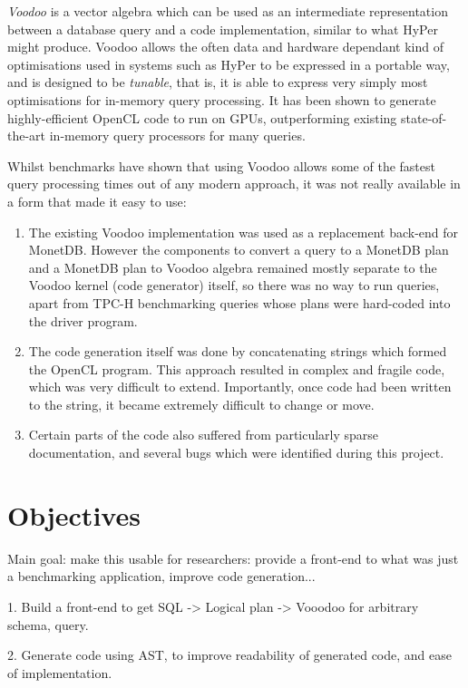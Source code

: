 \emph{Voodoo} \cite{Pirk:2016:VVA:3007328.3007336} is a vector algebra which can be used as an intermediate representation between a database query and a code implementation, similar to what HyPer might produce. Voodoo allows the often data and hardware dependant kind of optimisations used in systems such as HyPer to be expressed in a portable way, and is designed to be \emph{tunable}, that is, it is able to express very simply most optimisations for in-memory query processing. It has been shown to generate highly-efficient OpenCL code to run on GPUs, outperforming existing state-of-the-art in-memory query processors for many queries.

Whilst benchmarks have shown that using Voodoo allows some of the fastest query processing times out of any modern approach, it was not really available in a form that made it easy to use:

\begin{enumerate}
    \item The existing Voodoo implementation was used as a replacement back-end for MonetDB. However the components to convert a query to a MonetDB plan and a MonetDB plan to Voodoo algebra remained mostly separate to the Voodoo kernel (code generator) itself, so there was no way to run queries, apart from TPC-H benchmarking queries whose plans were hard-coded into the driver program.
    \item The code generation itself was done by concatenating strings which formed the OpenCL program. This approach resulted in complex and fragile code, which was very difficult to extend. Importantly, once code had been written to the string, it became extremely difficult to change or move.
    \item Certain parts of the code also suffered from particularly sparse documentation, and several bugs which were identified during this project.
\end{enumerate}

\section{Objectives}

Main goal: make this usable for researchers: provide a front-end to what was just a benchmarking application, improve code generation...

1. Build a front-end to get SQL -> Logical plan -> Vooodoo for arbitrary schema, query.

2. Generate code using AST, to improve readability of generated code, and ease of implementation.

